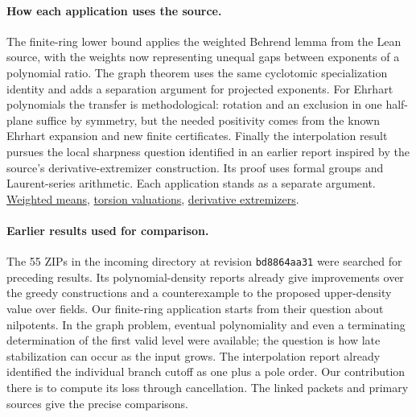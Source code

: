 \documentclass[11pt,letterpaper]{article}
\newcommand{\source}[2]{\href{https://github.com/lsernau/grh-lean/blob/72fead102f663d5c7a407964a13dc0cf9d977207/grh/src/#1}{#2}}
\begin{document}
\paragraph{How each application uses the source.}
The finite-ring lower bound applies the weighted Behrend lemma from the Lean source, with the weights now representing unequal gaps between exponents of a polynomial ratio. The graph theorem uses the same cyclotomic specialization identity and adds a separation argument for projected exponents. For Ehrhart polynomials the transfer is methodological: rotation and an exclusion in one half-plane suffice by symmetry, but the needed positivity comes from the known Ehrhart expansion and new finite certificates. Finally the interpolation result pursues the local sharpness question identified in an earlier report inspired by the source's derivative-extremizer construction. Its proof uses formal groups and Laurent-series arithmetic. Each application stands as a separate argument. \source{New/Reduction/Data/Existence.lean}{Weighted means}, \source{New/Congruences/Selmer/RootsOfUnity.lean}{torsion valuations}, \source{New/Derivatives/Sharpness/OneCurve.lean}{derivative extremizers}.

\paragraph{Earlier results used for comparison.}
The 55 ZIPs in the incoming directory at revision \texttt{bd8864aa31} were searched for preceding results. Its polynomial-density reports already give improvements over the greedy constructions and a counterexample to the proposed upper-density value over fields. Our finite-ring application starts from their question about nilpotents. In the graph problem, eventual polynomiality and even a terminating determination of the first valid level were available; the question is how late stabilization can occur as the input grows. The interpolation report already identified the individual branch cutoff as one plus a pole order. Our contribution there is to compute its loss through cancellation. The linked packets and primary sources give the precise comparisons. \cite{products,graphprior,branchprior,fields}

\clearpage


\clearpage

\clearpage


\clearpage


\clearpage
\end{document}
